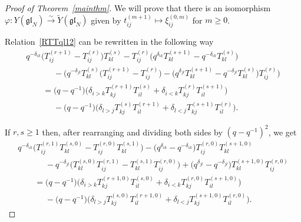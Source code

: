 \documentclass[pdftex]{sigma}
\numberwithin{theorem}{section}
\numberwithin{proposition}{section}
\numberwithin{lemma}{section}
\numberwithin{corollary}{section}
\numberwithin{definition}{section}
\numberwithin{example}{section}
\numberwithin{remark}{section}
\numberwithin{note}{section}
\numberwithin{equation}{section}
\begin{document}
\begin{proof}[Proof of Theorem~\ref{mainthm}] We will prove that there is an isomorphism $\varphi\colon Y(\mathfrak{gl}_N)
\stackrel{\sim}{\longrightarrow} \widetilde{Y}(\mathfrak{gl}_N)$ given by $t_{ij}^{(m+1)} \mapsto
\xi_{ij}^{(0,m)}$ for $m\ge 0$.

Relation~\eqref{RTTql12} can be rewritten in the following way
\begin{gather*}
q^{-\delta_{ik}}\big(T_{ij}^{(r+1)} - T_{ij}^{(r)}\big) T_{kl}^{(s)}- T_{ij}^{(r)} \big(q^{\delta_{ik}}T_{kl}^{(s+1)}
- q^{-\delta_{ik}}T_{kl}^{(s)}\big)
\\
\qquad\phantom{=}{}
- \big(q^{-\delta_{jl}}T_{kl}^{(s)} \big(T_{ij}^{(r+1)} - T_{ij}^{(r)}\big) - \big(q^{\delta_{jl}}T_{kl}^{(s+1)} -
q^{-\delta_{jl}}T_{kl}^{(s)}\big) T_{ij}^{(r)} \big)
\\
\qquad
= \big(q-q^{-1}\big) \big(\delta_{i>k}T_{kj}^{(r+1)} T_{il}^{(s)} + \delta_{i<k} T_{kj}^{(r)} T_{il}^{(s+1)}\big)
\\
\qquad\phantom{=}{}
  - \big(q-q^{-1}\big) \big(\delta_{l>j} T_{kj}^{(s)} T_{il}^{(r+1)} + \delta_{l<j} T_{kj}^{(s+1)} T_{il}^{(r)} \big).
\end{gather*}

If $r,s \geq 1$ then, after rearranging and dividing both sides by $(q-q^{-1})^2$, we get
\begin{gather*}
q^{-\delta_{ik}} \big(T_{ij}^{(r,1)} T_{kl}^{(s,0)}- T_{ij}^{(r,0)} T_{kl}^{(s,1)} \big) - \big(q^{\delta_{ik}} -
q^{-\delta_{ik}}\big) T_{ij}^{(r,0)} T_{kl}^{(s+1,0)}
\\
\qquad\phantom{=}{}
 - q^{-\delta_{jl}} \big(T_{kl}^{(s,0)} T_{ij}^{(r,1)} - T_{kl}^{(s,1)} T_{ij}^{(r,0)} \big) + \big(q^{\delta_{jl}} -
q^{-\delta_{jl}}\big) T_{kl}^{(s+1,0)} T_{ij}^{(r,0)}
\\
\qquad
= \big(q-q^{-1}\big) \big(  \delta_{i>k} T_{kj}^{(r+1,0)} T_{il}^{(s,0)} + \delta_{i<k} T_{kj}^{(r,0)} T_{il}^{(s+1,0)}\big)
\\
\qquad\phantom{=}{}
  - \big(q-q^{-1}\big) \big(\delta_{l>j} T_{kj}^{(s,0)} T_{il}^{(r+1,0)} + \delta_{l<j} T_{kj}^{(s+1,0)} T_{il}^{(r,0)} \big).
\end{gather*}


\end{proof}
\end{document}
